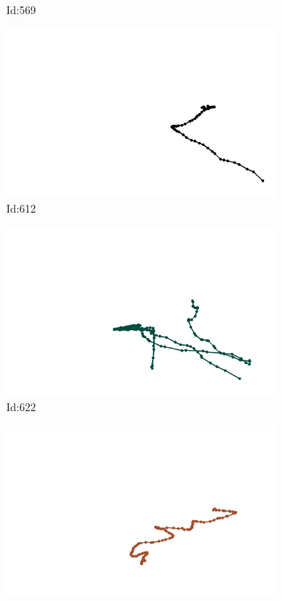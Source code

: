 \documentclass[12pt,twoside]{report}
\begin{document}
\begin{figure}
\begin{subfigure}[b]{0.20\textwidth}
\caption{Id:569}
\end{subfigure}
\begin{subfigure}[b]{0.20\textwidth}
\centering
\includegraphics[width=\textwidth]{../trajectories/612.png}
\caption{Id:612}
\end{subfigure}
\begin{subfigure}[b]{0.20\textwidth}
\centering
\includegraphics[width=\textwidth]{../trajectories/622.png}
\caption{Id:622}
\end{subfigure}
\begin{subfigure}[b]{0.20\textwidth}
\centering
\includegraphics[width=\textwidth]{../trajectories/691.png}

\end{subfigure}
\end{figure}
\end{document}
